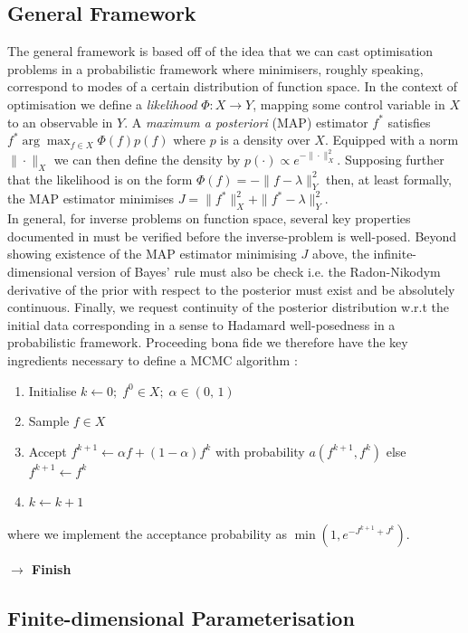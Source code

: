 \documentclass[runningheads]{llncs}
\begin{document}
\subsection{General Framework}\label{subs:gf}

The general framework is based off of the idea that we can cast optimisation
problems in a probabilistic framework where minimisers, roughly speaking,
correspond to modes of a certain distribution of function space.  In the context
of optimisation we define a \emph{likelihood} $\Phi : X\rightarrow Y$, mapping
some control variable in $X$ to an observable in $Y$.  A \emph{maximum a
posteriori} (MAP) estimator $f^*$ satisfies $f^* \arg\max_{f\in X} \Phi(f) p(f)$
where $p$ is a density over $X$. Equipped with a norm $\|\cdot\|_X$ we can then
define the density by $p(\cdot) \propto e^{-\|\cdot\|_X^2}$.  Supposing further
that the likelihood is on the form $\Phi(f) = -\|f-\lambda\|_Y^2$ then, at least
formally, the MAP estimator minimises $J =\|f^*\|_X^2 + \|f^*-\lambda\|_Y^2$.\\

In general, for inverse problems on function space, several key properties
documented in \cite{?} must be verified before the inverse-problem is
well-posed. Beyond showing existence of the MAP estimator minimising $J$ above,
the infinite-dimensional version of Bayes' rule must also be check i.e. the
Radon-Nikodym derivative of the prior with respect to the posterior must exist
and be absolutely continuous. Finally, we request continuity of the posterior
distribution w.r.t the initial data corresponding in a sense to Hadamard
well-posedness in a probabilistic framework. Proceeding bona fide we therefore
have the key ingredients necessary to define a MCMC algorithm
\cite{cotter2013mcmc}:
\begin{enumerate}
\item Initialise $k \gets 0;\; f^0 \in X;\; \alpha \in (0,\,1)$ 
\item Sample $f\in X$
\item Accept $f^{k+1} \gets \alpha f + (1-\alpha) f^k$ with probability
$a(f^{k+1}, f^k)$ else $f^{k+1} \gets f^k$
\item $k \gets k + 1$
\end{enumerate}
where we implement the acceptance probability as $\min(1, e^{-J^{k+1} +
J^k})$.

\textbf{$\longrightarrow$ Finish}\\

\subsection{Finite-dimensional Parameterisation}\label{subs:finite-dim-param}
\end{document}
